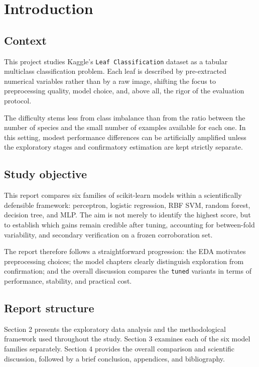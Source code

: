 \section{Introduction}

\subsection{Context}
This project studies Kaggle's \texttt{Leaf Classification} dataset as a tabular multiclass classification problem. Each leaf is described by pre-extracted numerical variables rather than by a raw image, shifting the focus to preprocessing quality, model choice, and, above all, the rigor of the evaluation protocol.

The difficulty stems less from class imbalance than from the ratio between the number of species and the small number of examples available for each one. In this setting, modest performance differences can be artificially amplified unless the exploratory stages and confirmatory estimation are kept strictly separate.

\subsection{Study objective}
This report compares six families of scikit-learn models within a scientifically defensible framework: perceptron, logistic regression, RBF SVM, random forest, decision tree, and MLP. The aim is not merely to identify the highest score, but to establish which gains remain credible after tuning, accounting for between-fold variability, and secondary verification on a frozen corroboration set.

The report therefore follows a straightforward progression: the EDA motivates preprocessing choices; the model chapters clearly distinguish exploration from confirmation; and the overall discussion compares the \texttt{tuned} variants in terms of performance, stability, and practical cost.

\subsection{Report structure}
Section 2 presents the exploratory data analysis and the methodological framework used throughout the study. Section 3 examines each of the six model families separately. Section 4 provides the overall comparison and scientific discussion, followed by a brief conclusion, appendices, and bibliography.

